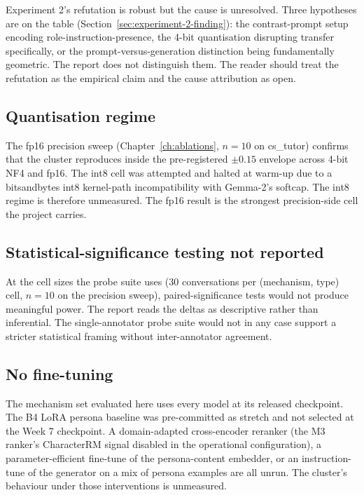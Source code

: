Experiment 2's refutation is robust but the cause is unresolved. Three hypotheses are on the table (Section~\ref{sec:experiment-2-finding}): the contrast-prompt setup encoding role-instruction-presence, the 4-bit quantisation disrupting transfer specifically, or the prompt-versus-generation distinction being fundamentally geometric. The report does not distinguish them. The reader should treat the refutation as the empirical claim and the cause attribution as open.

\subsection{Quantisation regime}

The fp16 precision sweep (Chapter~\ref{ch:ablations}, $n = 10$ on cs\_tutor) confirms that the cluster reproduces inside the pre-registered $\pm 0.15$ envelope across 4-bit NF4 and fp16. The int8 cell was attempted and halted at warm-up due to a bitsandbytes int8 kernel-path incompatibility with Gemma-2's softcap. The int8 regime is therefore unmeasured. The fp16 result is the strongest precision-side cell the project carries.

\subsection{Statistical-significance testing not reported}

At the cell sizes the probe suite uses (30 conversations per (mechanism, type) cell, $n = 10$ on the precision sweep), paired-significance tests would not produce meaningful power. The report reads the deltas as descriptive rather than inferential. The single-annotator probe suite would not in any case support a stricter statistical framing without inter-annotator agreement.

\subsection{No fine-tuning}

The mechanism set evaluated here uses every model at its released checkpoint. The B4 LoRA persona baseline was pre-committed as stretch and not selected at the Week 7 checkpoint. A domain-adapted cross-encoder reranker (the M3 ranker's CharacterRM signal disabled in the operational configuration), a parameter-efficient fine-tune of the persona-content embedder, or an instruction-tune of the generator on a mix of persona examples are all unrun. The cluster's behaviour under those interventions is unmeasured.

